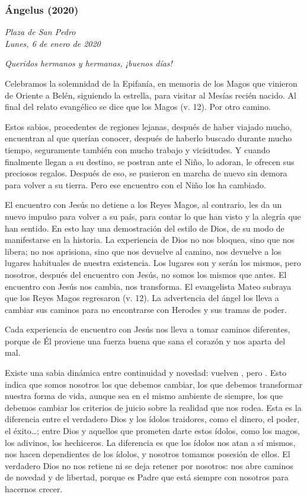 {\subsubsection{Ángelus (2020)}

\emph{Plaza de San Pedro\\ Lunes, 6 de enero de 2020}



\emph{Queridos hermanos y hermanas, ¡buenos días!}

Celebramos la solemnidad de la Epifanía, en memoria de los Magos que vinieron de Oriente a Belén, siguiendo la estrella, para visitar al Mesías recién nacido. Al final del relato evangélico se dice que los Magos  (v. 12). Por otro camino.

Estos sabios, procedentes de regiones lejanas, después de haber viajado mucho, encuentran al que querían conocer, después de haberlo buscado durante mucho tiempo, seguramente también con mucho trabajo y vicisitudes. Y cuando finalmente llegan a su destino, se postran ante el Niño, lo adoran, le ofrecen sus preciosos regalos. Después de eso, se pusieron en marcha de nuevo sin demora para volver a su tierra. Pero ese encuentro con el Niño los ha cambiado.

El encuentro con Jesús no detiene a los Reyes Magos, al contrario, les da un nuevo impulso para volver a su país, para contar lo que han visto y la alegría que han sentido. En esto hay una demostración del estilo de Dios, de su modo de manifestarse en la historia. La experiencia de Dios no nos bloquea, sino que nos libera; no nos aprisiona, sino que nos devuelve al camino, nos devuelve a los lugares habituales de nuestra existencia. Los lugares son y serán los mismos, pero nosotros, después del encuentro con Jesús, no somos los mismos que antes. El encuentro con Jesús nos cambia, nos transforma. El evangelista Mateo subraya que los Reyes Magos regresaron  (v. 12). La advertencia del ángel los lleva a cambiar sus caminos para no encontrarse con Herodes y sus tramas de poder.

Cada experiencia de encuentro con Jesús nos lleva a tomar caminos diferentes, porque de Él proviene una fuerza buena que sana el corazón y nos aparta del mal.

Existe una sabia dinámica entre continuidad y novedad: vuelven , pero . Esto indica que somos nosotros los que debemos cambiar, los que debemos transformar nuestra forma de vida, aunque sea en el mismo ambiente de siempre, los que debemos cambiar los criterios de juicio sobre la realidad que nos rodea. Esta es la diferencia entre el verdadero Dios y los ídolos traidores, como el dinero, el poder, el éxito\ldots{}; entre Dios y aquellos que prometen darte estos ídolos, como los magos, los adivinos, los hechiceros. La diferencia es que los ídolos nos atan a sí mismos, nos hacen dependientes de los ídolos, y nosotros tomamos posesión de ellos. El verdadero Dios no nos retiene ni se deja retener por nosotros: nos abre caminos de novedad y de libertad, porque es Padre que está siempre con nosotros para hacernos crecer.

}
